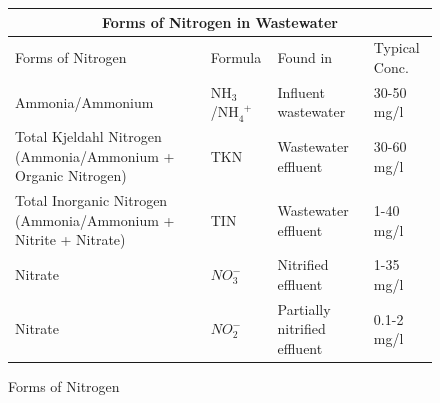 					      \begin{center}
					      \begin{figure}[!htbp]
					      	\noindent \begin{tabular}[!htbp]{ |p{6cm}|p{2.0cm}|p{2.5cm}|p{}|}
					      	\hline
					      	\multicolumn{4}{|c|}{\textbf{Forms of Nitrogen in Wastewater}} \\
					      	\hline
					      	
					      	\hspace{1.8 cm}Forms of Nitrogen & \hspace{0.25 cm} Formula & \hspace{.4 cm} Found in & \hspace{.4 cm} Typical \newline \hspace{.2 cm}Conc.\\
					      	\hline
					      	\small Ammonia/Ammonium & \small NH$_3$/NH$_4^{\enspace +}$ &  \small Influent wastewater & 30-50 mg/l\\
					      	
					      	Total Kjeldahl Nitrogen \newline  \small (Ammonia/Ammonium + Organic Nitrogen) &  \small TKN &  \small Wastewater \newline  \small effluent  & 30-60 mg/l \\
					      	
					      	\small Total Inorganic Nitrogen \newline  \small (Ammonia/Ammonium + Nitrite + Nitrate) & \small TIN &  \small  Wastewater \newline  \small effluent  & 1-40 mg/l \\
					      	
					      	\small Nitrate  & $NO_3^{-}$ &  \small Nitrified effluent &  \small 1-35 mg/l \\
					      	
					      	\small Nitrate  &  $NO_2^{-}$ &  \small Partially nitrified effluent &  \small 0.1-2 mg/l \\
					      	
					      	\hline
					      	\end{tabular}
					      	\caption{Forms of Nitrogen}
					      	\end{figure}
					      \end{center}
					      
